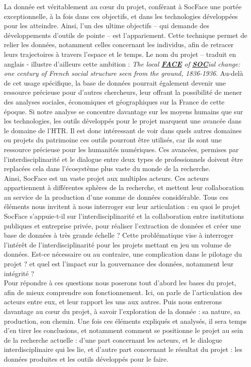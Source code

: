 \documentclass[a4paper,12pt,twoside]{book}
\begin{document}
La donnée est véritablement au cœur du projet, conférant à SocFace une portée exceptionnelle, à la fois dans ces objectifs, et dans les technologies développées pour les atteindre. Ainsi, l’un des ultime objectifs – qui demande des développements d’outils de pointe – est l’appariement. Cette technique permet de relier les données, notamment celles concernant les individus, afin de retracer leurs trajectoires à travers l'espace et le temps. Le nom du projet – traduit en anglais - illustre d'ailleurs cette ambition : \textit{The local \textbf{\underline{FACE}} of \textbf{\underline{SOC}}ial change: one century of French social structure seen from the ground, 1836-1936}. Au-delà de cet usage spécifique, la base de données pourrait également devenir une ressource précieuse pour d'autres chercheurs, leur offrant la possibilité de mener des analyses sociales, économiques et géographiques sur la France de cette époque. Si notre analyse se concentre davantage sur les moyens humains que sur les technologies, les outils développés pour le projet marquent une avancée dans le domaine de l’\gls{HTR}. Il est donc intéressant de voir dans quels autres domaines ou projets du patrimoine ces outils pourront être utilisés, car ils sont une ressource précieuse pour les humanités numériques. Ces avancées, permises par l’interdisciplinarité et le dialogue entre deux types de professionnels doivent être replacées cela dans l’écosystème plus vaste du monde de la recherche. \\

Ainsi, SocFace est un vaste projet aux multiples acteurs. Ces acteurs appartiennent à différentes sphères de la recherche, et mettent leur collaboration au service de la production d’une somme de données considérable. Tous ces éléments nous invitent à nous interroger sur leur articulation : 
en quoi le projet SocFace s'appuie-t-il sur l'interdisciplinarité et la collaboration entre institutions publiques et entreprise privée, pour réaliser l'extraction de données et créer une base de données à très grande échelle ?  Cette problématique vise à interroger l’intérêt de l’interdisciplinarité pour les projets mettant en jeu un volume de données. Est-ce nécessaire ou au contraire, une complication dans le pilotage du projet ? et quel est l’impact sur la gouvernance des données, notamment leur intégrité ?\\

Pour répondre à ces questions nous poserons tout d’abord les bases du projet, afin de mieux comprendre son fonctionnement. Ici, on parle de l’articulation des acteurs entre eux, et leur rapport les uns aux autres. Puis nous entrerons davantage au cœur du projet, à savoir l’exploration de la donnée : sa nature, sa production, son chemin. Une fois ces éléments expliqués et analysés, il sera temps d’en tirer les conclusions, et notamment comment se positionne le projet au sein de la recherche actuelle : d’une part concernant les acteurs, et le dialogue interdisciplinaire qui les lie, et d’autre part concernant le résultat du projet : les données produites et les outils développés pour le faire. 
\newpage{\pagestyle{empty}\cleardoublepage}
\end{document}
